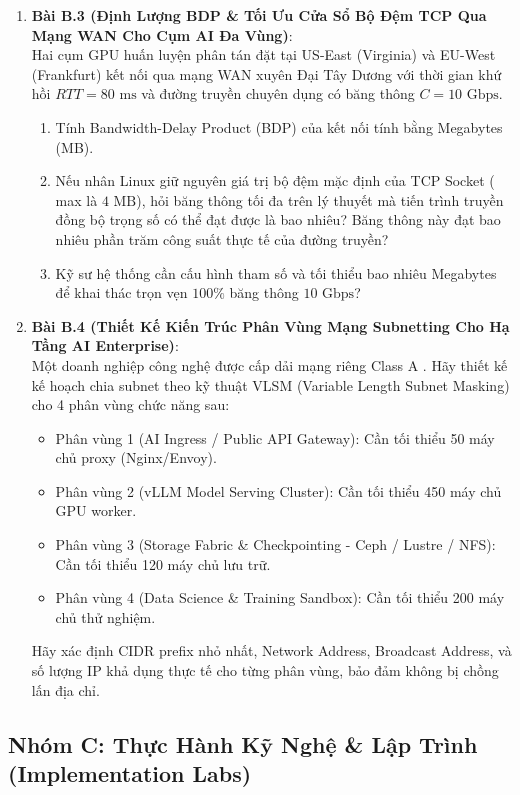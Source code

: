 \begin{enumerate}
  \item \textbf{Bài B.3 (Định Lượng BDP \& Tối Ưu Cửa Sổ Bộ Đệm TCP Qua Mạng WAN Cho Cụm AI Đa Vùng)}: \\
  Hai cụm GPU huấn luyện phân tán đặt tại US-East (Virginia) và EU-West (Frankfurt) kết nối qua mạng WAN xuyên Đại Tây Dương với thời gian khứ hồi $RTT = 80\text{ ms}$ và đường truyền chuyên dụng có băng thông $C = 10\text{ Gbps}$.
  \begin{enumerate}
    \item Tính Bandwidth-Delay Product (BDP) của kết nối tính bằng Megabytes (MB).
    \item Nếu nhân Linux giữ nguyên giá trị bộ đệm mặc định của TCP Socket ( max là $4\text{ MB}$), hỏi băng thông tối đa trên lý thuyết mà tiến trình truyền đồng bộ trọng số có thể đạt được là bao nhiêu? Băng thông này đạt bao nhiêu phần trăm công suất thực tế của đường truyền?
    \item Kỹ sư hệ thống cần cấu hình tham số  và  tối thiểu bao nhiêu Megabytes để khai thác trọn vẹn $100\%$ băng thông $10\text{ Gbps}$?
  \end{enumerate}

  \item \textbf{Bài B.4 (Thiết Kế Kiến Trúc Phân Vùng Mạng Subnetting Cho Hạ Tầng AI Enterprise)}: \\
  Một doanh nghiệp công nghệ được cấp dải mạng riêng Class A . Hãy thiết kế kế hoạch chia subnet theo kỹ thuật VLSM (Variable Length Subnet Masking) cho 4 phân vùng chức năng sau:
  \begin{itemize}
    \item Phân vùng 1 (AI Ingress / Public API Gateway): Cần tối thiểu 50 máy chủ proxy (Nginx/Envoy).
    \item Phân vùng 2 (vLLM Model Serving Cluster): Cần tối thiểu 450 máy chủ GPU worker.
    \item Phân vùng 3 (Storage Fabric \& Checkpointing - Ceph / Lustre / NFS): Cần tối thiểu 120 máy chủ lưu trữ.
    \item Phân vùng 4 (Data Science \& Training Sandbox): Cần tối thiểu 200 máy chủ thử nghiệm.
  \end{itemize}
  Hãy xác định CIDR prefix nhỏ nhất, Network Address, Broadcast Address, và số lượng IP khả dụng thực tế cho từng phân vùng, bảo đảm không bị chồng lấn địa chỉ.
\end{enumerate}

\subsection{Nhóm C: Thực Hành Kỹ Nghệ \& Lập Trình (Implementation Labs)}

